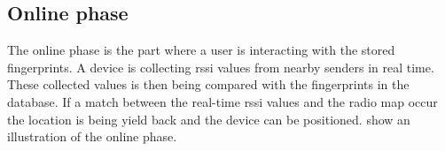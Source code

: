 \subsection{Online phase}\label{sec:theoryFingerprintOnline} The online phase
is the part where a user is interacting with the stored fingerprints.
A device is collecting \acrshort{rssi} values from nearby senders in real time.
These collected values is then being compared with the fingerprints in the database.
If a match between the real-time \acrshort{rssi} values and the radio map occur the location is being yield back and the device can be positioned.
 show an illustration of the
online phase.
\cite{IndoorFingerprintPositioning2017}



